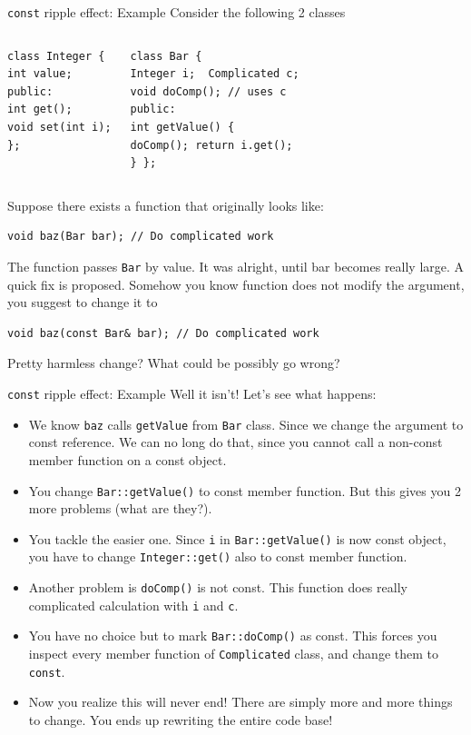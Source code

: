 \begin{frame}[fragile]{\texttt{const} ripple effect: Example }
Consider the following 2 classes
\begin{columns}

\vspace{-.2in}
\begin{verbatim}
class Integer {
int value;
public:
int get();
void set(int i);
};
\end{verbatim}

\vspace{-.2in}
\begin{verbatim}
class Bar {
Integer i;  Complicated c;
void doComp(); // uses c
public:
int getValue() { 
doComp(); return i.get(); 
} };
\end{verbatim}
\end{columns}

Suppose there exists a function that originally looks like:
\begin{verbatim}
void baz(Bar bar); // Do complicated work
\end{verbatim}
The function passes \texttt{Bar} by value. It was alright, until bar becomes really large. A quick fix is proposed. Somehow you know function does not modify the argument, you suggest to change it to 
\begin{verbatim}
void baz(const Bar& bar); // Do complicated work
\end{verbatim}
Pretty harmless change? What could be possibly go wrong?
\end{frame}

\begin{frame}{\texttt{const} ripple effect: Example}
Well it isn't! Let's see what happens:
\begin{itemize}
\small
\item We know \texttt{baz} calls \texttt{getValue} from \texttt{Bar} class. Since we change the argument to const reference. We can no long do that, since you cannot call a non-const member function on a const object.
\item You change \texttt{Bar::getValue()} to const member function. But this gives you 2 more problems (what are they?).
\item You tackle the easier one. Since \texttt{i} in \texttt{Bar::getValue()} is now const object, you have to change \texttt{Integer::get()} also to const member function.
\item Another problem is \texttt{doComp()} is not const. This function does really complicated calculation with \texttt{i} and \texttt{c}. 
\item You have no choice but to mark \texttt{Bar::doComp()} as const. This forces you inspect every member function of \texttt{Complicated} class, and change them to \texttt{const}.
\item Now you realize this will never end! There are simply more and more things to change. You ends up rewriting the entire code base! 
\end{itemize}
\end{frame}

